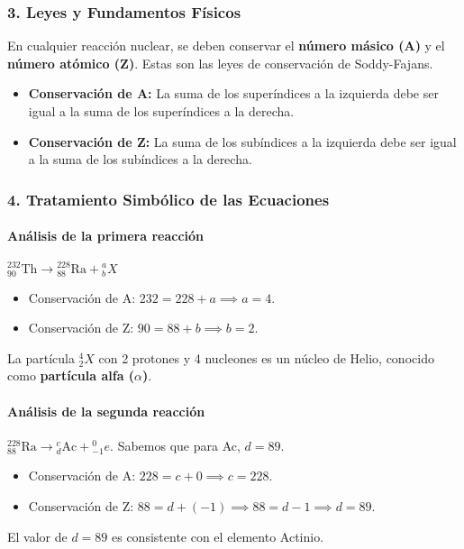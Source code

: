 \subsubsection*{3. Leyes y Fundamentos Físicos}
En cualquier reacción nuclear, se deben conservar el \textbf{número másico (A)} y el \textbf{número atómico (Z)}. Estas son las leyes de conservación de Soddy-Fajans.
\begin{itemize}
    \item \textbf{Conservación de A:} La suma de los superíndices a la izquierda debe ser igual a la suma de los superíndices a la derecha.
    \item \textbf{Conservación de Z:} La suma de los subíndices a la izquierda debe ser igual a la suma de los subíndices a la derecha.
\end{itemize}

\subsubsection*{4. Tratamiento Simbólico de las Ecuaciones}
\paragraph*{Análisis de la primera reacción}
${}_{90}^{232}\text{Th} \longrightarrow {}_{88}^{228}\text{Ra} + {}_{b}^{a}X$
\begin{itemize}
    \item Conservación de A: $232 = 228 + a \implies a = 4$.
    \item Conservación de Z: $90 = 88 + b \implies b = 2$.
\end{itemize}
La partícula ${}_{2}^{4}X$ con 2 protones y 4 nucleones es un núcleo de Helio, conocido como \textbf{partícula alfa ($\alpha$)}.

\paragraph*{Análisis de la segunda reacción}
${}_{88}^{228}\text{Ra} \longrightarrow {}_{d}^{c}\text{Ac} + {}_{-1}^{0}e$. Sabemos que para Ac, $d=89$.
\begin{itemize}
    \item Conservación de A: $228 = c + 0 \implies c = 228$.
    \item Conservación de Z: $88 = d + (-1) \implies 88 = d-1 \implies d=89$.
\end{itemize}
El valor de $d=89$ es consistente con el elemento Actinio.


